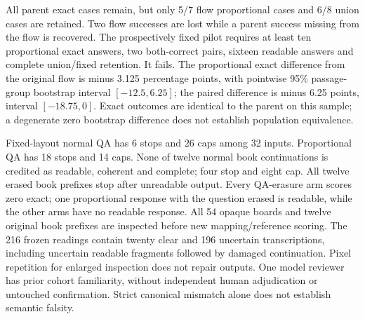 \documentclass[12pt,a4paper]{article}
\providecommand{\DIFadd}[1]{{\protect\color{blue} \sf #1}} %
\begin{document}
\DIFadd{All parent exact cases remain, but only 5/7 flow proportional cases and 6/8
union cases are retained. Two flow successes are lost while a parent success
missing from the flow is recovered. The prospectively fixed pilot requires
at least ten proportional exact answers, two both-correct pairs, sixteen
readable answers and complete union/fixed retention. It fails. The
proportional exact difference from the original flow is minus 3.125 percentage
points, with pointwise 95\% passage-group bootstrap interval $[-12.5,6.25]$;
the paired difference is minus 6.25 points, interval $[-18.75,0]$. Exact
outcomes are identical to the parent on this sample; a degenerate zero
bootstrap difference does not establish population equivalence.
}

\DIFadd{Fixed-layout normal QA has 6 stops and 26 caps among 32 inputs. Proportional
QA has 18 stops and 14 caps. None of twelve
normal book continuations is credited as readable, coherent and complete;
four stop and eight cap. All twelve erased book prefixes stop after unreadable
output. Every QA-erasure arm scores zero exact; one proportional response
with the question erased is readable, while the other arms have no readable response.
All 54 opaque boards and twelve original book prefixes are inspected before
new mapping/reference scoring. The 216 frozen readings contain twenty clear
and 196 uncertain transcriptions, including uncertain readable fragments
followed by damaged continuation. Pixel repetition for enlarged inspection
does not repair outputs. One model reviewer has prior cohort familiarity,
without independent human adjudication or untouched confirmation. Strict
canonical mismatch alone does not establish semantic falsity.
}

\end{document}
